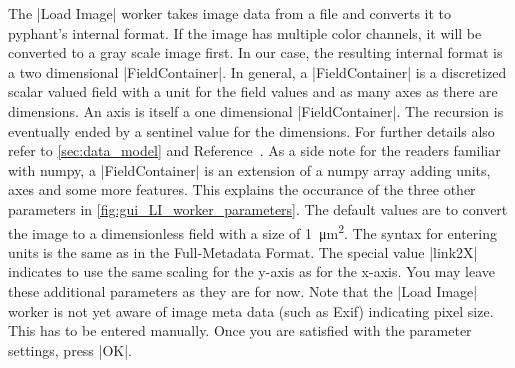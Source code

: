 \documentclass[a4paper]{article}
\begin{document}
The |Load Image| worker takes image data from a file and converts it
to pyphant's internal format. If the image has multiple color
channels, it will be converted to a gray scale image first. In our
case, the resulting internal format is a two dimensional
|FieldContainer|. In general, a |FieldContainer| is a discretized
scalar valued field with a unit for the field values and as many axes
as there are dimensions. An axis is itself a one dimensional
|FieldContainer|. The recursion is eventually ended by a sentinel
value for the dimensions. For further details also refer to
\autoref{sec:data_model} and Reference~\cite{pyphant}. As a side note
for the readers familiar with numpy\cite{numpy}, a |FieldContainer| is
an extension of a numpy array adding units, axes and some more
features. This explains the occurance of the three other parameters in
\autoref{fig:gui_LI_worker_parameters}. The default values are to
convert the image to a dimensionless field with a size of
\SI{1}{\micro\metre\squared}. The syntax for entering units is the
same as in the Full-Metadata Format\cite{Riede2010651}. The special
value |link2X| indicates to use the same scaling for the y-axis as for
the x-axis. You may leave these additional parameters as they are for
now. Note that the |Load Image| worker is not yet aware of image meta
data (such as Exif) indicating pixel size. This has to be entered
manually. Once you are satisfied with the parameter settings, press
|OK|.
\end{document}
